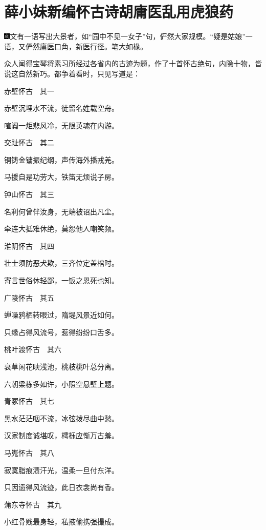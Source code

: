 

\chapter{薛小妹新编怀古诗\hspace{.5em}胡庸医乱用虎狼药}

{\includegraphics[width=3mm]{../Images/00005}文有一语写出大景者，如``园中不见一女子''句，俨然大家规模。``疑是姑娘''一语，又俨然庸医口角，新医行径。笔大如椽。}

众人闻得宝琴将素习所经过各省内的古迹为题，作了十首怀古绝句，内隐十物，皆说这自然新巧。都争着看时，只见写道是：

赤壁怀古　其一

赤壁沉埋水不流，徒留名姓载空舟。

喧阗一炬悲风冷，无限英魂在内游。

交趾怀古　其二

铜铸金镛振纪纲，声传海外播戎羌。

马援自是功劳大，铁笛无烦说子房。

钟山怀古　其三

名利何曾伴汝身，无端被诏出凡尘。

牵连大抵难休绝，莫怨他人嘲笑频。

淮阴怀古　其四

壮士须防恶犬欺，三齐位定盖棺时。

寄言世俗休轻鄙，一饭之恩死也知。

广陵怀古　其五

蝉噪鸦栖转眼过，隋堤风景近如何。

只缘占得风流号，惹得纷纷口舌多。

桃叶渡怀古　其六

衰草闲花映浅池，桃枝桃叶总分离。

六朝梁栋多如许，小照空悬壁上题。

青冢怀古　其七

黑水茫茫咽不流，冰弦拨尽曲中愁。

汉家制度诚堪叹，樗栎应惭万古羞。

马嵬怀古　其八

寂寞脂痕渍汗光，温柔一旦付东洋。

只因遗得风流迹，此日衣衾尚有香。

蒲东寺怀古　其九

小红骨贱最身轻，私掖偷携强撮成。

